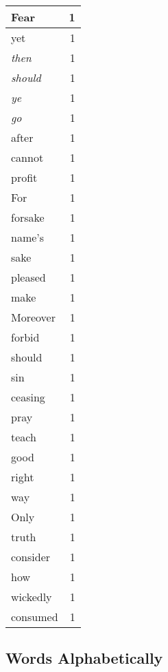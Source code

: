 \begin{center}
\begin{longtable}{l|r}
Fear & 1 \\ \hline
yet & 1 \\ \hline
\emph{then} & 1 \\ \hline
\emph{should} & 1 \\ \hline
\emph{ye} & 1 \\ \hline
\emph{go} & 1 \\ \hline
after & 1 \\ \hline
cannot & 1 \\ \hline
profit & 1 \\ \hline
For & 1 \\ \hline
forsake & 1 \\ \hline
name's & 1 \\ \hline
sake & 1 \\ \hline
pleased & 1 \\ \hline
make & 1 \\ \hline
Moreover & 1 \\ \hline
forbid & 1 \\ \hline
should & 1 \\ \hline
sin & 1 \\ \hline
ceasing & 1 \\ \hline
pray & 1 \\ \hline
teach & 1 \\ \hline
good & 1 \\ \hline
right & 1 \\ \hline
way & 1 \\ \hline
Only & 1 \\ \hline
truth & 1 \\ \hline
consider & 1 \\ \hline
how & 1 \\ \hline
wickedly & 1 \\ \hline
consumed & 1 \\ \hline
\end{longtable}
\end{center}



\normalsize



\subsection{Words Alphabetically}

